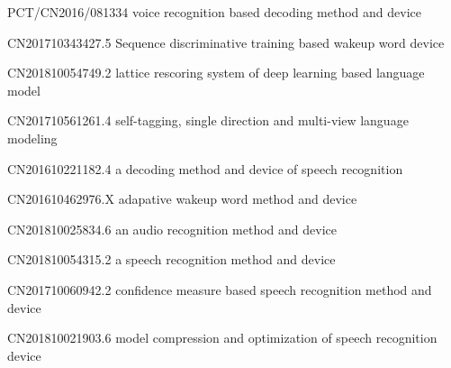 \begin{patents}{99}
    \item PCT/CN2016/081334   voice recognition based decoding method and device 
	\item CN201710343427.5  Sequence discriminative training based wakeup word device
	\item CN201810054749.2  lattice rescoring system of deep learning based language model 
	\item CN201710561261.4  self-tagging, single direction and multi-view language modeling
	\item CN201610221182.4  a decoding method and device of speech recognition
	\item CN201610462976.X  adapative wakeup word method and device
	\item CN201810025834.6  an audio recognition method and device
	\item CN201810054315.2  a speech recognition method and device
	\item CN201710060942.2  confidence measure based speech recognition method and device
	\item CN201810021903.6  model compression and optimization of speech recognition device
\end{patents}
